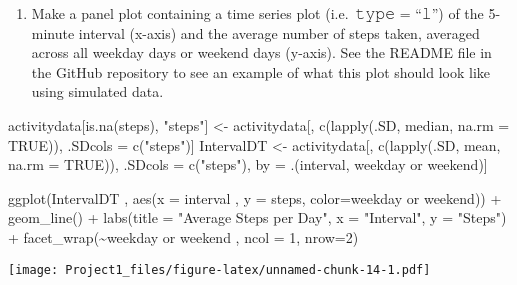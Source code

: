 \documentclass[
]{article}
\newenvironment{Shaded}{\begin{snugshade}}{\end{snugshade}}
\newcommand{\AttributeTok}[1]{\textcolor[rgb]{0.77,0.63,0.00}{#1}}
\newcommand{\ConstantTok}[1]{\textcolor[rgb]{0.00,0.00,0.00}{#1}}
\newcommand{\DecValTok}[1]{\textcolor[rgb]{0.00,0.00,0.81}{#1}}
\newcommand{\FunctionTok}[1]{\textcolor[rgb]{0.00,0.00,0.00}{#1}}
\newcommand{\NormalTok}[1]{#1}
\newcommand{\OtherTok}[1]{\textcolor[rgb]{0.56,0.35,0.01}{#1}}
\newcommand{\SpecialCharTok}[1]{\textcolor[rgb]{0.00,0.00,0.00}{#1}}
\newcommand{\StringTok}[1]{\textcolor[rgb]{0.31,0.60,0.02}{#1}}
\providecommand{\tightlist}{%
  \setlength{\itemsep}{0pt}\setlength{\parskip}{0pt}}
\begin{document}
\begin{enumerate}
\def\labelenumi{\arabic{enumi}.}
\setcounter{enumi}{1}
\tightlist
\item
  Make a panel plot containing a time series plot (i.e.~𝚝𝚢𝚙𝚎 = ``𝚕'') of
  the 5-minute interval (x-axis) and the average number of steps taken,
  averaged across all weekday days or weekend days (y-axis). See the
  README file in the GitHub repository to see an example of what this
  plot should look like using simulated data.
\end{enumerate}

\begin{Shaded}
\begin{Highlighting}[]
\NormalTok{activitydata[}\FunctionTok{is.na}\NormalTok{(steps), }\StringTok{"steps"}\NormalTok{] }\OtherTok{\textless{}{-}}\NormalTok{ activitydata[, }\FunctionTok{c}\NormalTok{(}\FunctionTok{lapply}\NormalTok{(.SD, median, }\AttributeTok{na.rm =} \ConstantTok{TRUE}\NormalTok{)), .SDcols }\OtherTok{=} \FunctionTok{c}\NormalTok{(}\StringTok{"steps"}\NormalTok{)]}
\NormalTok{IntervalDT }\OtherTok{\textless{}{-}}\NormalTok{ activitydata[, }\FunctionTok{c}\NormalTok{(}\FunctionTok{lapply}\NormalTok{(.SD, mean, }\AttributeTok{na.rm =} \ConstantTok{TRUE}\NormalTok{)), .SDcols }\OtherTok{=} \FunctionTok{c}\NormalTok{(}\StringTok{"steps"}\NormalTok{), by }\OtherTok{=}\NormalTok{ .(interval, }\StringTok{\textasciigrave{}}\AttributeTok{weekday or weekend}\StringTok{\textasciigrave{}}\NormalTok{)]}

\FunctionTok{ggplot}\NormalTok{(IntervalDT , }\FunctionTok{aes}\NormalTok{(}\AttributeTok{x =}\NormalTok{ interval , }\AttributeTok{y =}\NormalTok{ steps, }\AttributeTok{color=}\StringTok{\textasciigrave{}}\AttributeTok{weekday or weekend}\StringTok{\textasciigrave{}}\NormalTok{)) }\SpecialCharTok{+} \FunctionTok{geom\_line}\NormalTok{() }\SpecialCharTok{+} \FunctionTok{labs}\NormalTok{(}\AttributeTok{title =} \StringTok{"Average Steps per Day"}\NormalTok{, }\AttributeTok{x =} \StringTok{"Interval"}\NormalTok{, }\AttributeTok{y =} \StringTok{"Steps"}\NormalTok{) }\SpecialCharTok{+} \FunctionTok{facet\_wrap}\NormalTok{(}\SpecialCharTok{\textasciitilde{}}\StringTok{\textasciigrave{}}\AttributeTok{weekday or weekend}\StringTok{\textasciigrave{}}\NormalTok{ , }\AttributeTok{ncol =} \DecValTok{1}\NormalTok{, }\AttributeTok{nrow=}\DecValTok{2}\NormalTok{)}
\end{Highlighting}
\end{Shaded}

\texttt{[image: Project1\_files/figure-latex/unnamed-chunk-14-1.pdf]}
\end{document}
